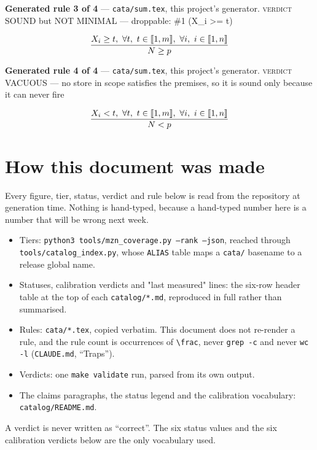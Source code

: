 \documentclass[10pt,a4paper]{article}
\newcommand{\rulebox}[1]{%
  \[\resizebox{\ifdim\width>\linewidth\linewidth\else\width\fi}{!}%
    {$\displaystyle #1$}\]}
\begin{document}
{\small\textbf{Generated rule 3 of 4} --- \texttt{cata/sum.tex}, this project's generator. \textsc{verdict} SOUND but NOT MINIMAL --- droppable: \#1 (X\_i >= t)\par}
\rulebox{\frac{X_{i} \geq t,~\forall t,~t \in \llbracket1,m\rrbracket,~\forall i,~i \in \llbracket1,n\rrbracket}{N \geq p}}

{\small\textbf{Generated rule 4 of 4} --- \texttt{cata/sum.tex}, this project's generator. \textsc{verdict} VACUOUS --- no store in scope satisfies the premises, so it is sound only because it can never fire\par}
\rulebox{\frac{X_{i}<t,~\forall t,~t \in \llbracket1,m\rrbracket,~\forall i,~i \in \llbracket1,n\rrbracket}{N<p}}
\clearpage
\section{How this document was made}\label{sec:howmade}
Every figure, tier, status, verdict and rule below is read from the repository at generation time. Nothing is hand-typed, because a hand-typed number here is a number that will be wrong next week.
\begin{itemize}\setlength{\itemsep}{0pt}
\item Tiers: \texttt{python3 tools/mzn\_coverage.py --rank --json}, reached through \texttt{tools/catalog\_index.py}, whose \texttt{ALIAS} table maps a \texttt{cata/} basename to a release global name.
\item Statuses, calibration verdicts and "last measured" lines: the six-row header table at the top of each \texttt{catalog/*.md}, reproduced in full rather than summarised.
\item Rules: \texttt{cata/*.tex}, copied verbatim. This document does not re-render a rule, and the rule count is occurrences of \texttt{\textbackslash{}frac}, never \texttt{grep -c} and never \texttt{wc -l} (\texttt{CLAUDE.md}, ``Traps'').
\item Verdicts: one \texttt{make validate} run, parsed from its own output.
\item The claims paragraphs, the status legend and the calibration vocabulary: \texttt{catalog/README.md}.
\end{itemize}
A verdict is never written as ``correct''. The six status values and the six calibration verdicts below are the only vocabulary used.
\end{document}
